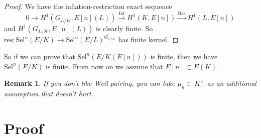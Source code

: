 \documentclass{article}
\newtheorem{rmk}[thm]{Remark}
\newcommand{\mn}{\mu_{n}}
\begin{document}
\begin{proof}
We have the inflation-restriction exact sequence
$$ 0\to H ^{1}(G _{L/K}, E [n](L))\xrightarrow{\mathrm{Inf}}
H ^{1}(K, E [n]) \xrightarrow{\mathrm{Res}}
H ^{1}(L, E [n])$$
and $ H ^{1}(G _{L/K}, E [n](L)) $ is clearly finite.
So $ \mathrm{res}: \mathrm{Sel}^{n}(E/K)\to \mathrm{Sel}^{n}(E/L)^{G _{L/K}} $
has finite kernel.
\end{proof}

So if we can prove that $ \mathrm{Sel}^{n}(E/K (E [n])) $ is finite,
then we have $ \mathrm{Sel}^{n}(E/K) $ is finite.
From now on we assume that $ E [n]\subset E (K) $.
\begin{rmk}
If you don't like Weil pairing, you can take $ \mn \subset K ^{\times} $ as an
additional assumption that doesn't hurt.
\end{rmk}

\section{Proof}
\end{document}
